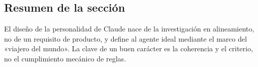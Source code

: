 \subsection{Resumen de la sección}

El diseño de la personalidad de Claude nace de la investigación en alineamiento, no de un requisito de producto, y define al agente ideal mediante el marco del «viajero del mundo». La clave de un buen carácter es la coherencia y el criterio, no el cumplimiento mecánico de reglas.

